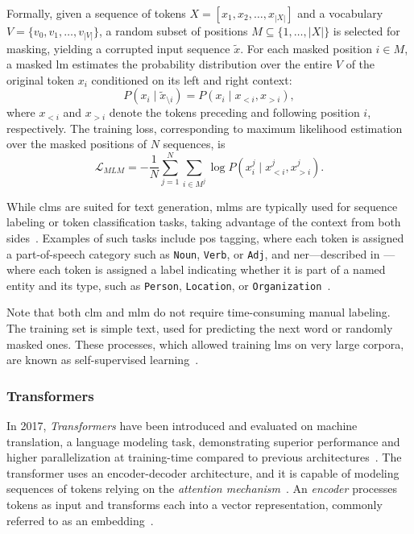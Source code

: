 Formally, given a sequence of tokens $X = [x_1, x_2, \ldots, x_{|X|}]$ and a vocabulary $V = \{v_0, v_1, \ldots, v_{|V|}\}$, a random subset of positions 
$M \subseteq \{1, \ldots, |X|\}$ is selected for masking, yielding a corrupted input sequence $\tilde{x}$. 
For each masked position $i \in M$, a masked \ac{lm} estimates the probability distribution over the entire $V$ of the original token $x_i$ conditioned on its left and right context:
\begin{equation}
    P(x_i \mid \tilde{x}_{\setminus i}) = P(x_i \mid x_{<i}, x_{>i}),
\end{equation}
where $x_{<i}$ and $x_{>i}$ denote the tokens preceding and following position $i$, respectively. 
The training loss, corresponding to maximum likelihood estimation over the masked positions of $N$ sequences, is
\begin{equation}
    \mathcal{L}_{MLM} = - \frac{1}{N} \sum_{j=1}^{N} \sum_{i \in M^j} \log P(x_i^j \mid x_{<i}^j, x_{>i}^j).
\end{equation}

While \acp{clm} are suited for text generation, \acp{mlm} are typically used for sequence labeling or token classification tasks, taking advantage of the context from both sides~\cite{jm3}. Examples of such tasks include \acf{pos} tagging, where each token is assigned a part-of-speech category such as \texttt{Noun}, \texttt{Verb}, or \texttt{Adj}, and \acf{ner}---described in ---where each token is assigned a label indicating whether it is part of a named entity and its type, such as \texttt{Person}, \texttt{Location}, or \texttt{Organization}~\cite{jm3}.

Note that both \ac{clm} and \ac{mlm} do not require time-consuming manual labeling. The training set is simple text, used for predicting the next word or randomly masked ones. These processes, which allowed training \aclp{lm} on very large corpora, are known as self-supervised learning~\cite{jm3}.

\subsubsection{Transformers}

In 2017, \emph{Transformers} have been introduced and evaluated on machine translation, a language modeling task, demonstrating superior performance and higher parallelization at training-time compared to previous architectures~\cite{vaswani_transformers_2017}.
The transformer uses an encoder-decoder architecture, and it is capable of modeling sequences of tokens relying on the \emph{attention mechanism}~\cite{vaswani_transformers_2017}.
An \emph{encoder} processes tokens as input and transforms each into a vector representation, commonly referred to as an embedding~\cite{jm3}.


